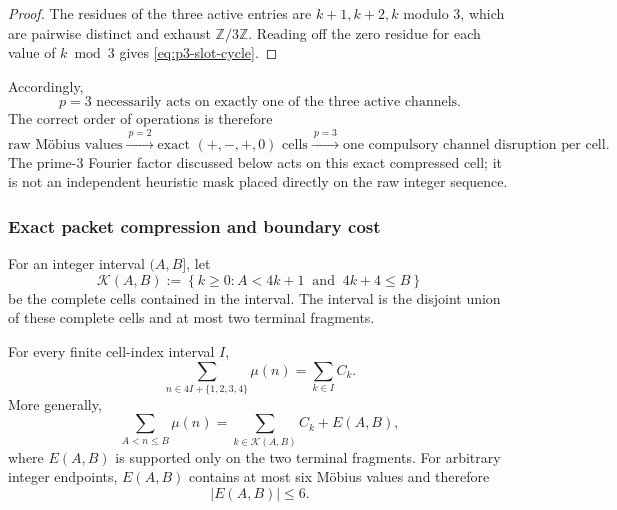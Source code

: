\begin{proof}
The residues of the three active entries are $k+1,k+2,k$ modulo $3$, which
are pairwise distinct and exhaust $\mathbb Z/3\mathbb Z$.  Reading off the
zero residue for each value of $k\bmod3$ gives \cref{eq:p3-slot-cycle}.
\end{proof}

Accordingly,
\begin{equation}
 \boxed{
 p=3\text{ necessarily acts on exactly one of the three active channels}.
 }
 \label{eq:p3-disrupts-cell}
\end{equation}
The correct order of operations is therefore
\[
 \text{raw M\"obius values}
 \xrightarrow{\ p=2\ }
 \text{exact }(+,-,+,0)\text{ cells}
 \xrightarrow{\ p=3\ }
 \text{one compulsory channel disruption per cell}.
\]
The prime-$3$ Fourier factor discussed below acts on this exact compressed
cell; it is not an independent heuristic mask placed directly on the raw
integer sequence.

\subsubsection{Exact packet compression and boundary cost}

For an integer interval $(A,B]$, let
\begin{equation}
 \mathcal K(A,B)
 :=\left\{k\ge0:
       A<4k+1\ \text{ and }\ 4k+4\le B
   \right\}
 \label{eq:complete-cell-index-set}
\end{equation}
be the complete cells contained in the interval.  The interval is the disjoint
union of these complete cells and at most two terminal fragments.

\begin{proposition}
\label{prop:complete-cell-packet-identity}
For every finite cell-index interval $I$,
\begin{equation}
 \boxed{
 \sum_{n\in4I+\{1,2,3,4\}}\mu(n)
 =\sum_{k\in I}C_k.
 }
 \label{eq:complete-cell-interval-identity}
\end{equation}
More generally,
\begin{equation}
 \sum_{A<n\le B}\mu(n)
 =\sum_{k\in\mathcal K(A,B)}C_k+E(A,B),
 \label{eq:arbitrary-packet-compression}
\end{equation}
where $E(A,B)$ is supported only on the two terminal fragments.  For arbitrary
integer endpoints, $E(A,B)$ contains at most six M\"obius values and therefore
\begin{equation}
 |E(A,B)|\le6.
 \label{eq:universal-boundary-six}
\end{equation}
\end{proposition}

